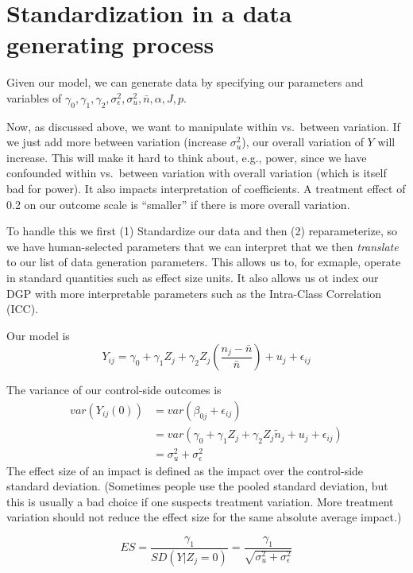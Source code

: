 \documentclass[
]{book}
\begin{document}
\hypertarget{standardization-in-a-data-generating-process}{%
\section{Standardization in a data generating process}\label{standardization-in-a-data-generating-process}}

Given our model, we can generate data by specifying our parameters and variables of \(\gamma_{0}, \gamma_{1}, \gamma_{2}, \sigma^2_\epsilon, \sigma^2_u, \bar{n}, \alpha, J, p\).

Now, as discussed above, we want to manipulate within vs.~between variation. If we just add more between variation (increase \(\sigma^2_u\)), our overall variation of \(Y\) will increase.
This will make it hard to think about, e.g., power, since we have confounded within vs.~between variation with overall variation (which is itself bad for power).
It also impacts interpretation of coefficients. A treatment effect of 0.2 on our outcome scale is ``smaller'' if there is more overall variation.

To handle this we first (1) Standardize our data and then (2) reparameterize, so we have human-selected parameters that we can interpret that we then \emph{translate} to our list of data generation parameters.
This allows us to, for exmaple, operate in standard quantities such as effect size units.
It also allows us ot index our DGP with more interpretable parameters such as the Intra-Class Correlation (ICC).

Our model is
\[ Y_{ij} = \gamma_{0} + \gamma_{1} Z_j + \gamma_2 Z_j \left(\frac{n_j - \bar{n}}{\bar{n}} \right)  + u_j + \epsilon_{ij}  \]

The variance of our control-side outcomes is
\[ 
\begin{aligned}
var( Y_{ij}(0) ) &= var( \beta_{0j} + \epsilon_{ij} ) \\
 &= var( \gamma_{0} + \gamma_{1} Z_j + \gamma_{2}Z_j \tilde{n}_j + u_j + \epsilon_{ij} ) \\
&= \sigma^2_u + \sigma^2_\epsilon
\end{aligned}
\]
The effect size of an impact is defined as the impact over the control-side standard deviation.
(Sometimes people use the pooled standard deviation, but this is usually a bad choice if one suspects treatment variation. More treatment variation should not reduce the effect size for the same absolute average impact.)

\[ ES = \frac{\gamma_1}{SD( Y | Z_j = 0 )} = \frac{\gamma_1}{\sqrt{ \sigma^2_u + \sigma^2_\epsilon } } \]
\end{document}
